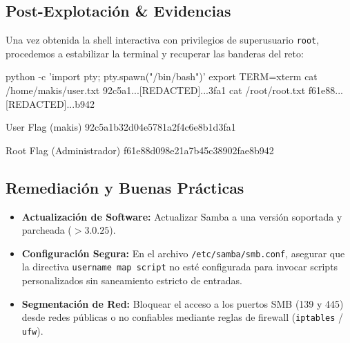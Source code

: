 \documentclass[../../../main_compilation.tex]{subfiles}
\begin{document}
\subsection{Post-Explotación \& Evidencias}

Una vez obtenida la shell interactiva con privilegios de superusuario \texttt{root}, procedemos a estabilizar la terminal y recuperar las banderas del reto:

\begin{terminal}
	python -c 'import pty; pty.spawn("/bin/bash")'
	export TERM=xterm
	cat /home/makis/user.txt
	92c5a1...[REDACTED]...3fa1
	cat /root/root.txt
	f61e88...[REDACTED]...b942
\end{terminal}

\begin{flagbox}{User Flag (makis)}
	92c5a1b32d04e5781a2f4c6e8b1d3fa1
\end{flagbox}

\begin{flagbox}{Root Flag (Administrador)}
	f61e88d098e21a7b45c38902fae8b942
\end{flagbox}

\subsection{Remediación y Buenas Prácticas}

\begin{mitigationbox}
	\begin{itemize}[leftmargin=*]
		\item \textbf{Actualización de Software:} Actualizar Samba a una versión soportada y parcheada ($> 3.0.25$).
		\item \textbf{Configuración Segura:} En el archivo \texttt{/etc/samba/smb.conf}, asegurar que la directiva \texttt{username map script} no esté configurada para invocar scripts personalizados sin saneamiento estricto de entradas.
		\item \textbf{Segmentación de Red:} Bloquear el acceso a los puertos SMB (139 y 445) desde redes públicas o no confiables mediante reglas de firewall (\texttt{iptables} / \texttt{ufw}).
	\end{itemize}
\end{mitigationbox}
\end{document}
